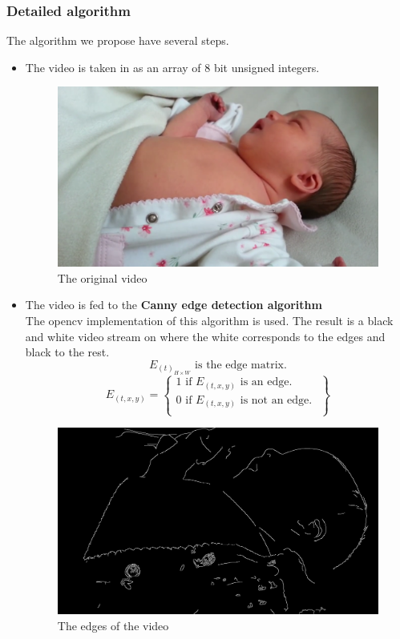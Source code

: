 \documentclass{report}
\begin{document}
\subsubsection{Detailed algorithm}
The algorithm we propose have several steps.
\begin{itemize}
    \item The video is taken in as an array of 8 bit unsigned integers.\\
    \begin{figure}[H]
        \centering
        \includegraphics[keepaspectratio,scale=0.25]{video01.png}
        \caption{The original video}
        \label{fig:my_label}
    \end{figure}
    
    \item The video is fed to the \textbf{Canny edge detection algorithm}\\
    The opencv implementation of this algorithm is used. The result is a black and white video stream on where the white corresponds to the edges and black to the rest.\\
    $$E_{(t)}_{H\times W} \textrm{ is the edge matrix.}$$ 
    $$E_{(t,x,y)}=  \left \{ \begin{array}{l}
        1 \textrm{ if } E_{(t,x,y)} \textrm{ is an edge. }\\
        0 \textrm{ if } E_{(t,x,y)} \textrm{ is not an edge. }\\ 
        \end{array} \right \} $$

    \begin{figure}[H]
        \centering
        \includegraphics[keepaspectratio,scale=0.22]{video02.png}
        \caption{The edges of the video}
        \label{fig:my_label}
    \end{figure}
    

\end{itemize}
\end{document}
